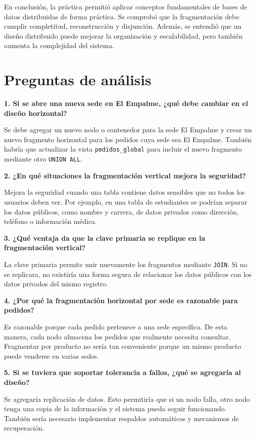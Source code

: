 \documentclass[12pt,a4paper]{article}
\begin{document}
En conclusión, la práctica permitió aplicar conceptos fundamentales de bases de datos distribuidas de forma práctica. Se comprobó que la fragmentación debe cumplir completitud, reconstrucción y disjunción. Además, se entendió que un diseño distribuido puede mejorar la organización y escalabilidad, pero también aumenta la complejidad del sistema.

\section{Preguntas de análisis}

\textbf{1. Si se abre una nueva sede en El Empalme, ¿qué debe cambiar en el diseño horizontal?}

Se debe agregar un nuevo nodo o contenedor para la sede El Empalme y crear un nuevo fragmento horizontal para los pedidos cuya sede sea El Empalme. También habría que actualizar la vista \texttt{pedidos\_global} para incluir el nuevo fragmento mediante otro \texttt{UNION ALL}.

\textbf{2. ¿En qué situaciones la fragmentación vertical mejora la seguridad?}

Mejora la seguridad cuando una tabla contiene datos sensibles que no todos los usuarios deben ver. Por ejemplo, en una tabla de estudiantes se podrían separar los datos públicos, como nombre y carrera, de datos privados como dirección, teléfono o información médica.

\textbf{3. ¿Qué ventaja da que la clave primaria se replique en la fragmentación vertical?}

La clave primaria permite unir nuevamente los fragmentos mediante \texttt{JOIN}. Si no se replicara, no existiría una forma segura de relacionar los datos públicos con los datos privados del mismo registro.

\textbf{4. ¿Por qué la fragmentación horizontal por sede es razonable para pedidos?}

Es razonable porque cada pedido pertenece a una sede específica. De esta manera, cada nodo almacena los pedidos que realmente necesita consultar. Fragmentar por producto no sería tan conveniente porque un mismo producto puede venderse en varias sedes.

\textbf{5. Si se tuviera que soportar tolerancia a fallos, ¿qué se agregaría al diseño?}

Se agregaría replicación de datos. Esto permitiría que si un nodo falla, otro nodo tenga una copia de la información y el sistema pueda seguir funcionando. También sería necesario implementar respaldos automáticos y mecanismos de recuperación.
\end{document}
